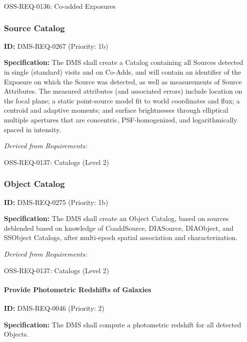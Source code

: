 \documentclass[SE,toc,lsstdraft]{lsstdoc}
\begin{document}
OSS-REQ-0136:
Co-added Exposures \newline

\subsubsection{Source Catalog}

\label{DMS-REQ-0267}
\textbf{ID:} DMS-REQ-0267 (Priority: 1b)

\textbf{Specification:} The DMS shall create a Catalog containing all Sources detected in single (standard) visits and on Co-Adds, and will contain an identifier of the Exposure on which the Source was detected, as well as measurements of Source Attributes. The measured attributes (and associated errors) include location on the focal plane; a static point-source model fit to world coordinates and flux; a centroid and adaptive moments; and surface brightnesses through elliptical multiple apertures that are concentric, PSF-homogenized, and logarithmically spaced in intensity.

\emph{Derived from Requirements:}

OSS-REQ-0137:
Catalogs (Level 2) \newline

\subsubsection{Object Catalog}

\label{DMS-REQ-0275}
\textbf{ID:} DMS-REQ-0275 (Priority: 1b)

\textbf{Specification:} The DMS shall create an Object Catalog, based on sources deblended based on knowledge of CoaddSource, DIASource, DIAObject, and SSObject Catalogs, after multi-epoch spatial association and characterization.

\emph{Derived from Requirements:}

OSS-REQ-0137:
Catalogs (Level 2) \newline

\paragraph{Provide Photometric Redshifts of Galaxies}\hfill  %

\label{DMS-REQ-0046}
\textbf{ID:} DMS-REQ-0046 (Priority: 2)

\textbf{Specification:} The DMS shall compute a photometric redshift for all detected Objects.
\end{document}
